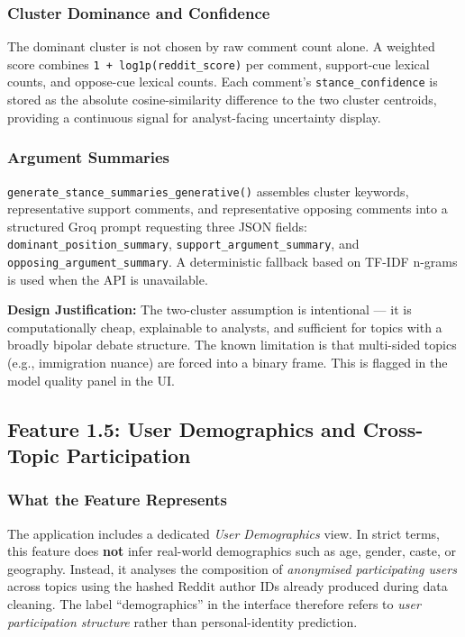 \documentclass[11pt,a4paper]{article}
\begin{document}
\subsubsection{Cluster Dominance and Confidence}

The dominant cluster is not chosen by raw comment count alone. A weighted score combines \texttt{1 + log1p(reddit\_score)} per comment, support-cue lexical counts, and oppose-cue lexical counts. Each comment's \texttt{stance\_confidence} is stored as the absolute cosine-similarity difference to the two cluster centroids, providing a continuous signal for analyst-facing uncertainty display.

\subsubsection{Argument Summaries}

\texttt{generate\_stance\_summaries\_generative()} assembles cluster keywords, representative support comments, and representative opposing comments into a structured Groq prompt requesting three JSON fields: \texttt{dominant\_position\_summary}, \texttt{support\_argument\_summary}, and \texttt{opposing\_argument\_summary}. A deterministic fallback based on TF-IDF n-grams is used when the API is unavailable.

\begin{tcolorbox}[warningbox]
\textbf{Design Justification:} The two-cluster assumption is intentional --- it is computationally cheap, explainable to analysts, and sufficient for topics with a broadly bipolar debate structure. The known limitation is that multi-sided topics (e.g., immigration nuance) are forced into a binary frame. This is flagged in the model quality panel in the UI.
\end{tcolorbox}

\subsection{Feature 1.5: User Demographics and Cross-Topic Participation}

\subsubsection{What the Feature Represents}

The application includes a dedicated \textit{User Demographics} view. In strict terms, this feature does \textbf{not} infer real-world demographics such as age, gender, caste, or geography. Instead, it analyses the composition of \textit{anonymised participating users} across topics using the hashed Reddit author IDs already produced during data cleaning. The label ``demographics'' in the interface therefore refers to \textit{user participation structure} rather than personal-identity prediction.
\end{document}
